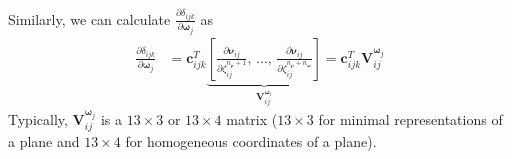 \documentclass{vgtc}                          %
\begin{document}
Similarly, we can calculate $\frac{\partial \delta_{ijk} }{\partial \bm{\omega}_{j}} $  as 
\begin{equation} \label{equ_d_omega}
	\begin{split}
		\frac{\partial \delta_{ijk} }{\partial \bm{\omega}_{j}} 
		& = \mathbf{c}_{ijk}^{T}\underbrace{\left[  \frac{\partial \bm{\nu}_{ij}}{\partial \zeta_{ij}^{n_{\bm{\rho}}+1}}, \, \dots, \,  \frac{\partial \bm{\nu}_{ij}}{\partial \zeta_{ij}^{n_{\bm{\rho}}+n_{\bm{\omega}}}} 
			\right]}_{\bm{V}^{{\bm{\omega}}_{i}}_{ij}}
		=  \mathbf{c}_{ijk}^{T}\bm{V}^{{\bm{\omega}}_{j}}_{ij}
	\end{split}
\end{equation}
Typically, $\bm{V}^{{\bm{\omega}}_{j}}_{ij} $ is a $13 \times 3$ or  $13 \times 4$ matrix ($13 \times 3$ for minimal representations of a plane \cite{kaess2015simultaneous,yang2019tightly} and $13 \times 4$ for homogeneous coordinates  of a plane\cite{hartley2003multiple}).%
\end{document}
